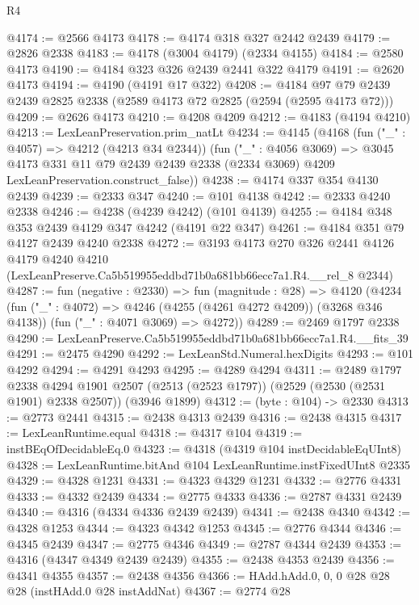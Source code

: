 \begin{lexlean}{R4}
\begin{coremodule}
@4174 := @2566 @4173
@4178 := @4174 @318 @327 @2442 @2439
@4179 := @2826 @2338
@4183 := @4178 (@3004 @4179) (@2334 @4155)
@4184 := @2580 @4173
@4190 := @4184 @323 @326 @2439 @2441 @322 @4179
@4191 := @2620 @4173
@4194 := @4190 (@4191 @17 @322)
@4208 := @4184 @97 @79 @2439 @2439 @2825 @2338 (@2589 @4173 @72 @2825 (@2594 (@2595 @4173 @72)))
@4209 := @2626 @4173
@4210 := @4208 @4209
@4212 := @4183 (@4194 @4210)
@4213 := LexLeanPreservation.prim_natLt
@4234 := @4145
    (@4168
      (fun ("_" : @4057) => @4212 (@4213 @34 @2344))
      (fun ("_" : @4056 @3069) =>
      @3045
        @4173
        @331
        @11
        @79
        @2439
        @2439
        @2338
        (@2334 @3069)
        @4209
        LexLeanPreservation.construct_false))
@4238 := @4174 @337 @354 @4130 @2439
@4239 := @2333 @347
@4240 := @101 @4138
@4242 := @2333 @4240 @2338
@4246 := @4238 (@4239 @4242) (@101 @4139)
@4255 := @4184 @348 @353 @2439 @4129 @347 @4242 (@4191 @22 @347)
@4261 := @4184 @351 @79 @4127 @2439 @4240 @2338
@4272 := @3193
    @4173
    @270
    @326
    @2441
    @4126
    @4179
    @4240
    @4210
    (LexLeanPreserve.Ca5b519955eddbd71b0a681bb66ecc7a1.R4.__rel_8 @2344)
@4287 := fun (negative : @2330) =>
  fun (magnitude : @28) =>
  @4120
    (@4234
      (fun ("_" : @4072) => @4246 (@4255 (@4261 @4272 @4209)) (@3268 @346 @4138))
      (fun ("_" : @4071 @3069) => @4272))
@4289 := @2469 @1797 @2338
@4290 := LexLeanPreserve.Ca5b519955eddbd71b0a681bb66ecc7a1.R4.__fits_39
@4291 := @2475 @4290
@4292 := LexLeanStd.Numeral.hexDigits
@4293 := @101 @4292
@4294 := @4291 @4293
@4295 := @4289 @4294
@4311 := @2489
    @1797
    @2338
    @4294
    @1901
    @2507
    (@2513 (@2523 @1797))
    (@2529 (@2530 (@2531 @1901) @2338 @2507))
    (@3946 @1899)
@4312 := (byte : @104) -> @2330
@4313 := @2773 @2441
@4315 := @2438 @4313 @2439
@4316 := @2438 @4315
@4317 := LexLeanRuntime.equal
@4318 := @4317 @104
@4319 := instBEqOfDecidableEq.{0}
@4323 := @4318 (@4319 @104 instDecidableEqUInt8)
@4328 := LexLeanRuntime.bitAnd @104 LexLeanRuntime.instFixedUInt8 @2335
@4329 := @4328 @1231
@4331 := @4323 @4329 @1231
@4332 := @2776 @4331
@4333 := @4332 @2439
@4334 := @2775 @4333
@4336 := @2787 @4331 @2439
@4340 := @4316 (@4334 @4336 @2439 @2439)
@4341 := @2438 @4340
@4342 := @4328 @1253
@4344 := @4323 @4342 @1253
@4345 := @2776 @4344
@4346 := @4345 @2439
@4347 := @2775 @4346
@4349 := @2787 @4344 @2439
@4353 := @4316 (@4347 @4349 @2439 @2439)
@4355 := @2438 @4353 @2439
@4356 := @4341 @4355
@4357 := @2438 @4356
@4366 := HAdd.hAdd.{0, 0, 0} @28 @28 @28 (instHAdd.{0} @28 instAddNat)
@4367 := @2774 @28

\end{coremodule}
\end{lexlean}

